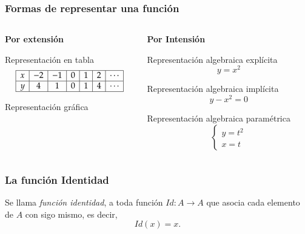 \begin{frame}
\frametitle{Formas de representar una función}
\begin{columns}
\begin{column}{.48\textwidth}
\textbf{Por extensión}
\begin{block}{Representación en tabla}
\[
\begin{array}{|c|c|c|c|c|c|c|}
\hline
 x & -2 & -1 & 0 & 1 & 2 & \cdots \\
\hline
 y & 4  & 1  & 0 & 1 & 4 & \cdots \\
\hline
\end{array}
\]
\end{block}
\begin{block}{Representación gráfica}
\begin{center}
\scalebox{0.7}{}
\end{center}
\end{block}
\end{column}
\begin{column}{.48\textwidth}
\textbf{Por Intensión}
\begin{block}{Representación algebraica explícita}
\[y=x^2\]
\end{block}
\begin{block}{Representación algebraica implícita}
\[y-x^2=0\]
\end{block}
\begin{block}{Representación algebraica paramétrica}
\[  
\begin{cases}
y=t^2\\
x=t
\end{cases}
\]
\end{block}
\end{column}   
\end{columns}
\end{frame} 


\begin{frame}
\frametitle{La función Identidad}
\begin{definicion}
Se llama \emph{función identidad}, a toda función $Id: A\rightarrow A$ que asocia cada elemento de $A$ con sigo mismo, es decir, 
\[Id(x)=x.\]
\end{definicion}
\begin{center}
\scalebox{1}{}
\end{center}
\end{frame} 



